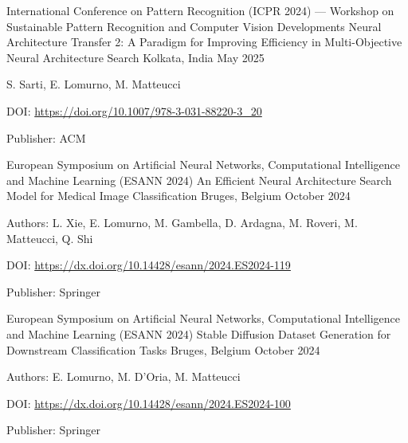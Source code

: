 \begin{cventries}
    \vspace{2mm}
    \cventry
        {International Conference on Pattern Recognition (ICPR 2024) --- Workshop on Sustainable Pattern Recognition and Computer Vision Developments} 
        {Neural Architecture Transfer 2: A Paradigm for Improving Efficiency in Multi-Objective Neural Architecture Search}
        {Kolkata, India}
        {May 2025}
        {
        \begin{cvitems}
            \item {S. Sarti, E. Lomurno, M. Matteucci}
            \item {DOI: \url{https://doi.org/10.1007/978-3-031-88220-3_20}}
            \item {Publisher: ACM}
        \end{cvitems}
        }

    \vspace{2mm}
    \cventry
        {European Symposium on Artificial Neural Networks, Computational Intelligence and Machine Learning (ESANN 2024)}
        {An Efficient Neural Architecture Search Model for Medical Image Classification}
        {Bruges, Belgium}
        {October 2024}
        {
        \begin{cvitems}
            \item {Authors: L. Xie, E. Lomurno, M. Gambella, D. Ardagna, M. Roveri, M. Matteucci, Q. Shi}
            \item {DOI: \url{https://dx.doi.org/10.14428/esann/2024.ES2024-119}}
            \item {Publisher: Springer}
        \end{cvitems}
        }

    \vspace{2mm}
    \cventry
        {European Symposium on Artificial Neural Networks, Computational Intelligence and Machine Learning (ESANN 2024)}
        {Stable Diffusion Dataset Generation for Downstream Classification Tasks}
        {Bruges, Belgium}
        {October 2024}
        {
        \begin{cvitems}
            \item {Authors: E. Lomurno, M. D'Oria, M. Matteucci}
            \item {DOI: \url{https://dx.doi.org/10.14428/esann/2024.ES2024-100}}
            \item {Publisher: Springer}
        \end{cvitems}
        }


\end{cventries}
